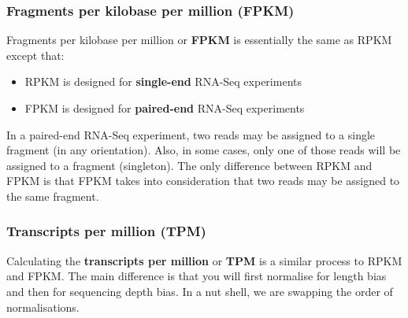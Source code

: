 \documentclass[11pt]{article}
\begin{document}
    \hypertarget{fragments-per-kilobase-per-million-fpkm}{%
\subsubsection{Fragments per kilobase per million
(FPKM)}\label{fragments-per-kilobase-per-million-fpkm}}

Fragments per kilobase per million or \textbf{FPKM} is essentially the
same as RPKM except that:

\begin{itemize}
\item
  RPKM is designed for \textbf{single-end} RNA-Seq experiments
\item
  FPKM is designed for \textbf{paired-end} RNA-Seq experiments
\end{itemize}

In a paired-end RNA-Seq experiment, two reads may be assigned to a
single fragment (in any orientation). Also, in some cases, only one of
those reads will be assigned to a fragment (singleton). The only
difference between RPKM and FPKM is that FPKM takes into consideration
that two reads may be assigned to the same fragment.

    \hypertarget{transcripts-per-million-tpm}{%
\subsubsection{Transcripts per million
(TPM)}\label{transcripts-per-million-tpm}}

Calculating the \textbf{transcripts per million} or \textbf{TPM} is a
similar process to RPKM and FPKM. The main difference is that you will
first normalise for length bias and then for sequencing depth bias. In a
nut shell, we are swapping the order of normalisations.
\end{document}
